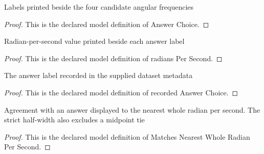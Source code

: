 \begin{definition}
  \label{def:physics:phyx-mini-0303:phyxminiproblems-problemphyxmini0303-answerchoice}
  Labels printed beside the four candidate angular frequencies
\end{definition}
\begin{proof}
  This is the declared model definition of Answer Choice.
\end{proof}
\begin{definition}
  \label{def:physics:phyx-mini-0303:phyxminiproblems-problemphyxmini0303-answerchoice-radianspersecond}
  Radian-per-second value printed beside each answer label
\end{definition}
\begin{proof}
  This is the declared model definition of radians Per Second.
\end{proof}
\begin{definition}
  \label{def:physics:phyx-mini-0303:phyxminiproblems-problemphyxmini0303-recordedanswerchoice}
  The answer label recorded in the supplied dataset metadata
\end{definition}
\begin{proof}
  This is the declared model definition of recorded Answer Choice.
\end{proof}
\begin{definition}
  \label{def:physics:phyx-mini-0303:phyxminiproblems-problemphyxmini0303-matchesnearestwholeradianpersecond}
  Agreement with an answer displayed to the nearest whole radian per second. The strict half-width also excludes a midpoint tie
\end{definition}
\begin{proof}
  This is the declared model definition of Matches Nearest Whole Radian Per Second.
\end{proof}
